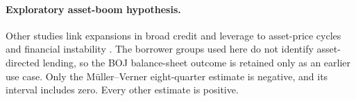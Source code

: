 \documentclass[11pt]{article}
\begin{document}
\paragraph{Exploratory asset-boom hypothesis.}
Other studies link expansions in broad credit and leverage to asset-price
cycles and financial instability
\citep{BorioLowe2002,JordaSchularickTaylor2015,SchularickTaylor2012}. The
borrower groups used here do not identify asset-directed lending, so the BOJ
balance-sheet outcome is retained only as an earlier use case. Only the
M\"uller--Verner eight-quarter estimate is negative, and its interval includes
zero. Every other estimate is positive.

\end{document}
